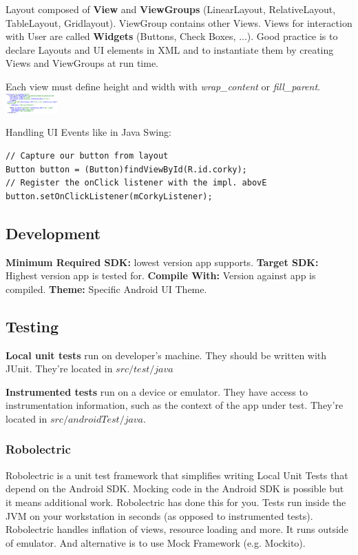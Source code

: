 Layout composed of \textbf{View} and \textbf{ViewGroups} (LinearLayout,
RelativeLayout, TableLayout, Gridlayout). ViewGroup contains other Views. Views
for interaction with User are called \textbf{Widgets} (Buttons, Check Boxes,
...). Good practice is to declare Layouts and UI elements in XML and to
instantiate them by creating Views and ViewGroups at run time.

Each view must define height and width with \textit{wrap\_content} or
\textit{fill\_parent}.
\includegraphics[width=0.15\textwidth]{android/view_example.png}

Handling UI Events like in Java Swing:
\begin{lstlisting}
// Capture our button from layout
Button button = (Button)findViewById(R.id.corky);
// Register the onClick listener with the impl. abovE
button.setOnClickListener(mCorkyListener);
\end{lstlisting}

\subsection{Development}
\textbf{Minimum Required SDK:} lowest version app supports.
\textbf{Target SDK:} Highest version app is tested for.
\textbf{Compile With:} Version against app is compiled.
\textbf{Theme:} Specific Android UI Theme.

\subsection{Testing}
\textbf{Local unit tests} run on developer’s machine. They should be written
with JUnit. They're located in $src/test/java$

\textbf{Instrumented tests} run on a device or emulator. They have access to
instrumentation information, such as the context of the app under test. They're
located in $src/androidTest/java$.

\subsubsection{Robolectric}
Robolectric is a unit test framework that simplifies writing Local Unit Tests
that depend on the Android SDK. Mocking code in the Android SDK is possible but
it means additional work.  Robolectric has done this for you. Tests run inside
the JVM on your workstation in seconds (as opposed to instrumented tests).
Robolectric handles inflation of views, resource loading and more. It runs
outside of emulator. And alternative is to use Mock Framework (e.g. Mockito).

